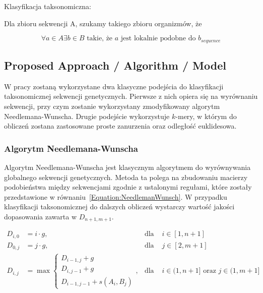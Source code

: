 \documentclass{article}
\newcommand{\temporary}[1]{
    \begin{tcolorbox}[colframe=red, colback=white, title={\textbf{WERSJA PO POLSKU}}, sharp corners=south]
        #1
    \end{tcolorbox}
}
\begin{document}
            \temporary{
                Klasyfikacja taksonomiczna:

                Dla zbioru sekwencji A, szukamy takiego zbioru organizmów, że 

                \[
                    \forall a \in A \exists b \in B \text{ takie, że } a \text{ jest lokalnie podobne do } b_{sequence}
                \]
            }

        \subsection{Proposed Approach / Algorithm / Model}

            \temporary{
                W pracy zostaną wykorzystane dwa klasyczne podejścia do klasyfikacji taksonomicznej sekwencji genetycznych. Pierwsze z nich opiera się na wyrównaniu sekwencji, przy czym zostanie wykorzystany zmodyfikowany algorytm Needlemana-Wunscha. Drugie podejście wykorzystuje $k$-mery, w którym do obliczeń zostana zastosowane proste zanurzenia oraz odległość euklidesowa.

                \subsubsection{Algorytm Needlemana-Wunscha}
        
                    Algorytm Needlemana-Wunscha jest klasycznym algorytmem do wyrównywania globalnego sekwencji genetycznych. Metoda ta polega na zbudowaniu macierzy podobieństwa między sekwencjami zgodnie z ustalonymi regułami, które zostały przedstawione w równaniu~\eqref{Equation:NeedlemanWunsch}. W przypadku klasyfikacji taksonomicznej do dalszych obliczeń wystarczy wartość jakości dopasowania zawarta w $D_{n + 1, m + 1}$.
        
                    \begin{equation}
                        \begin{aligned}
                            D_{i,0} &= i \cdot g, & \text{dla } & i \in [1, n + 1] \\
                            D_{0,j} &= j \cdot g, & \text{dla } & j \in [2, m + 1] \\
                            D_{i,j} &= \max
                            \begin{cases}
                                D_{i - 1, j} + g \\
                                D_{i, j - 1} + g \\
                                D_{i - 1, j - 1} + s(A_i, B_j)
                            \end{cases}, & \text{dla } & i \in (1, n + 1] \text{ oraz } j \in (1, m + 1]
                        \end{aligned}
                        \label{Equation:NeedlemanWunsch}
                    \end{equation}
        
}
\end{document}
